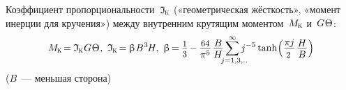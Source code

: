 \documentclass[14pt]{extarticle}
\newcommand{\lquote}[0]{«} %
\newcommand{\rquote}[0]{»} %
\newcommand{\inquotes}[1]{\lquote{#1}\rquote}
\begin{document}
Коэффициент пропорциональности~${\mathfrak{I}_{\hspace{-0.1ex}\mathrm{\scalebox{.6}{K}}}}$ (\inquotes{геометрическая жёсткость}, \inquotes{момент инерции для кручения}) между внутренним крутящим моментом~${M_{\hspace{-0.1ex}\mathrm{\scalebox{.6}{K}}}}$ и~${G \hspace{.1ex} \Theta}$:
\[
M_{\hspace{-0.1ex}\mathrm{\scalebox{.6}{K}}} \hspace{-0.3ex}=\hspace{-0.1ex}
\mathfrak{I}_{\hspace{-0.1ex}\mathrm{\scalebox{.6}{K}}} \hspace{.1ex} G \hspace{.1ex} \Theta
\hspace{.1ex} , \hspace{.33em}
\mathfrak{I}_{\hspace{-0.1ex}\mathrm{\scalebox{.6}{K}}} \hspace{-0.3ex}=\hspace{-0.1ex}
\upbeta \hspace{.1ex} B^{\hspace{.1ex}3} \hspace{-0.2ex} H
, \hspace{.33em}
%
\upbeta \hspace{-0.2ex}=\hspace{-0.1ex}
\scalebox{.88}{$\displaystyle\frac{\raisebox{-0.18em}{$1$}}{3}$}
\hspace{-0.1ex}-\hspace{-0.1ex} \displaystyle\frac{\raisebox{-0.18em}{\scalebox{.88}{$64$}}}{\pi^5} \hspace{.2ex} \displaystyle\frac{\raisebox{-0.2em}{$B$}}{H} \displaystyle\sum_{\mathclap{\hspace{.4em}j=1,3,..}}^{\raisebox{-0.1em}{\scalebox{.75}{$\infty$}}} j^{-5} \operatorname{tanh} \hspace{-0.33ex} \left( \displaystyle\frac{\raisebox{-0.18em}{$\pi \hspace{-0.1ex} j$}}{\scalebox{.88}{$2$}} \hspace{.2ex} \displaystyle\frac{\raisebox{-0.2em}{$H$}}{B} \hspace{.1ex} \right)
\vspace{-.6em}\]
($B$~--- меньшая сторона)
\vspace{.5em}
\end{document}
